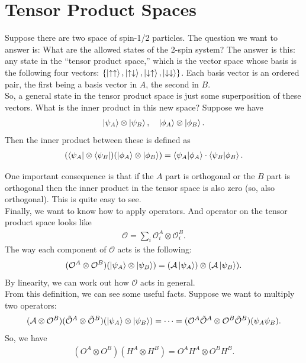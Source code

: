 \documentclass{book}
\theoremstyle{definition}
\begin{document}
\section{Tensor Product Spaces}

Suppose there are two space of spin-1/2 particles. The question we want to answer is: What are the allowed states of the 2-spin system? The answer is this: any state in the ``tensor product space,'' which is the vector space whose basis is the following four vectors: $\{ \ket{\uparrow\uparrow}, \ket{\uparrow\downarrow}, \ket{\downarrow\uparrow}, \ket{\downarrow\downarrow}\}$. Each basis vector is an ordered pair, the first being a basis vector in $A$, the second in $B$. \\


So, a general state in the tensor product space is just some superposition of these vectors. What is the inner product in this new space? Suppose we have
\begin{align}
\ket{\psi_A} \otimes \ket{\psi_B}, \quad \ket{\phi_A} \otimes \ket{\phi_B}.
\end{align}
Then the inner product between these is defined as 
\begin{align}
(\bra{\psi_A} \otimes \bra{\psi_B}) (\ket{\phi_A} \otimes \ket{\phi_B}) = \braket{\psi_A}{\phi_A} \cdot \braket{\psi_B}{\phi_B}.
\end{align}


One important consequence is that if the $A$ part is orthogonal or the $B$ part is orthogonal then the inner product in the tensor space is also zero (so, also orthogonal). This is quite easy to see. \\

Finally, we want to know how to apply operators. And operator on the tensor product space looks like
\begin{align}
\mathcal{O} = \sum_i \mathcal{O}^A_i \otimes \mathcal{O}^B_i.
\end{align}
The way each component of $\mathcal{O}$ acts is the following:
\begin{align}
(\mathcal{O}^A \otimes \mathcal{O}^B) (\ket{\psi_A} \otimes \ket{\psi_B}) = (\mathcal{A} \ket{\psi_A}) \otimes (\mathcal{A} \ket{\psi_B}).
\end{align}
By linearity, we can work out how $\mathcal{O}$ acts in general.\\

From this definition, we can see some useful facts. Suppose we want to multiply two operators: 
\begin{align}
(\mathcal{A} \otimes \mathcal{O}^B)(\tilde{\mathcal{O}}^A \otimes \tilde{\mathcal{O}}^B )(\ket{\psi_A} \otimes \ket{\psi_B}) = \dots = (\mathcal{O}^A\tilde{\mathcal{O}}^A \otimes \mathcal{O}^B\tilde{\mathcal{O}}^B)(\psi_A\psi_B).
\end{align}
So, we have
\begin{align}
(O^A \otimes O^B)(H^A \otimes H^B)= O^A H^A \otimes O^B H^B. 
\end{align}
\end{document}
